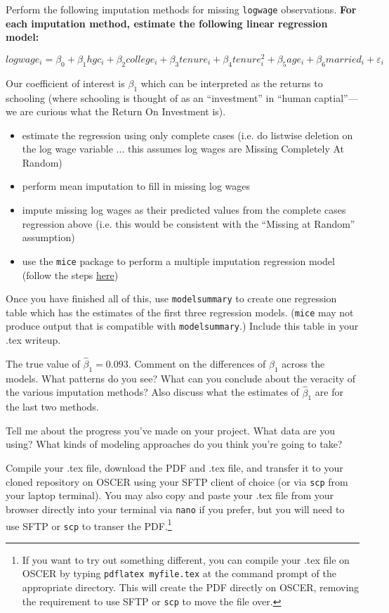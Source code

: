 \documentclass[12pt,english]{exam}
\begin{document}
\begin{questions}
\question Perform the following imputation methods for missing \texttt{logwage} observations. \textbf{For each imputation method, estimate the following linear regression model:}

\[
    logwage_{i} = \beta_{0} +  \beta_{1}hgc_{i} + \beta_{2}college_{i} + \beta_{3}tenure_{i} + \beta_{4}tenure^{2}_{i} + \beta_{5}age_{i} + \beta_{6}married_{i} + \varepsilon_{i}
\]

Our coefficient of interest is $\beta_{1}$ which can be interpreted as the returns to schooling (where schooling is thought of as an ``investment'' in ``human captial''---we are curious what the Return On Investment is).

\begin{itemize}
    \item estimate the regression using only complete cases (i.e. do listwise deletion on the log wage variable ... this assumes log wages are Missing Completely At Random)
    \item perform mean imputation to fill in missing log wages
    \item impute missing log wages as their predicted values from the complete cases regression above (i.e. this would be consistent with the ``Missing at Random'' assumption)
    \item use the \texttt{mice} package to perform a multiple imputation regression model (follow the steps \href{https://rpubs.com/mhanauer/mice}{here})
\end{itemize}

Once you have finished all of this, use \texttt{modelsummary} to create one regression table which has the estimates of the first three regression models. (\texttt{mice} may not produce output that is compatible with \texttt{modelsummary}.) Include this table in your .tex writeup. 

The true value of $\hat{\beta}_{1}=0.093$. Comment on the differences of $\hat{\beta}_{1}$ across the models. What patterns do you see? What can you conclude about the veracity of the various imputation methods? Also discuss what the estimates of $\hat{\beta}_{1}$ are for the last two methods.

\question Tell me about the progress you've made on your project. What data are you using? What kinds of modeling approaches do you think you're going to take?  

\question Compile your .tex file, download the PDF and .tex file, and transfer it to your cloned repository on OSCER using your SFTP client of choice (or via \texttt{scp} from your laptop terminal). You may also copy and paste your .tex file from your browser directly into your terminal via \texttt{nano} if you prefer, but you will need to use SFTP or \texttt{scp} to transer the PDF.\footnote{If you want to try out something different, you can compile your .tex file on OSCER by typing \texttt{pdflatex myfile.tex} at the command prompt of the appropriate directory. This will create the PDF directly on OSCER, removing the requirement to use SFTP or \texttt{scp} to move the file over.}


\end{questions}
\end{document}

